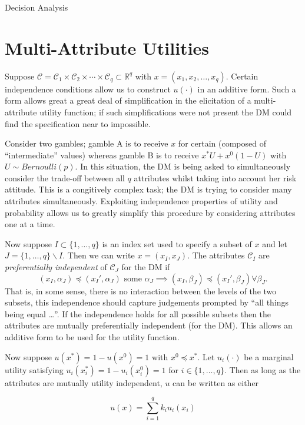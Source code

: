 \begin{chapter}{Decision Analysis \label{Ch:decision}}
\section{Multi-Attribute Utilities}

Suppose $\mathcal{C} = \mathcal{C}_1 \times \mathcal{C}_2 \times \cdots \times \mathcal{C}_q \subset \mathbb{R}^q$ with $x = (x_1, x_2, \ldots, x_q)$. Certain independence conditions allow us to construct $u(\cdot)$ in an additive form. Such a form allows great a great deal of simplification in the elicitation of a multi-attribute utility function; if such simplifications were not present the DM could find the specification near to impossible.

Consider two gambles; gamble A is to receive $x$ for certain (composed of ``intermediate'' values) whereas gamble B is to receive $x^*U + x^0(1-U)$ with $U \sim Bernoulli(p)$. In this situation, the DM is being asked to simultaneously consider the trade-off between all $q$ attributes whilst taking into account her risk attitude. This is a congitively complex task; the DM is trying to consider many attributes simultaneously. Exploiting independence properties of utility and probability allows us to greatly simplify this procedure by considering attributes one at a time.

Now suppose $I \subset \{1, \ldots, q \}$ is an index set used to specify a subset of $x$ and let $J = \{1, \ldots, q \} \backslash I$. Then we can write $x = (x_I, x_J)$. The attributes $\mathcal{C}_I$ are \textit{preferentially independent} of $\mathcal{C}_J$ for the DM if
\begin{equation}
	(x_I, \alpha_J) \preceq (x_I', \alpha_J) \text{ some } \alpha_J  \implies (x_I, \beta_J) \preceq (x_I', \beta_J) \forall \beta_J.
\end{equation}
That is, in some sense, there is no interaction between the levels of the two subsets, this independence should capture judgements prompted by ``all things being equal \ldots''. If the independence holds for all possible subsets then the attributes are mutually preferentially independent (for the DM). This allows an additive form to be used for the utility function.

Now suppose $u(x^*) = 1 - u(x^0) = 1$ with $x^0 \preceq x^*$. Let $u_i(\cdot)$ be a marginal utility satisfying $u_i(x_i^*) = 1 - u_i(x_i^0) = 1$ for $i \in \{1, \ldots, q \}$. Then as long as the attributes are mutually utility independent, $u$ can be written as either

\begin{equation}
	u(x) = \sum_{i=1}^q k_i u_i(x_i) \label{Eq:add-u}
\end{equation}


\end{chapter}
